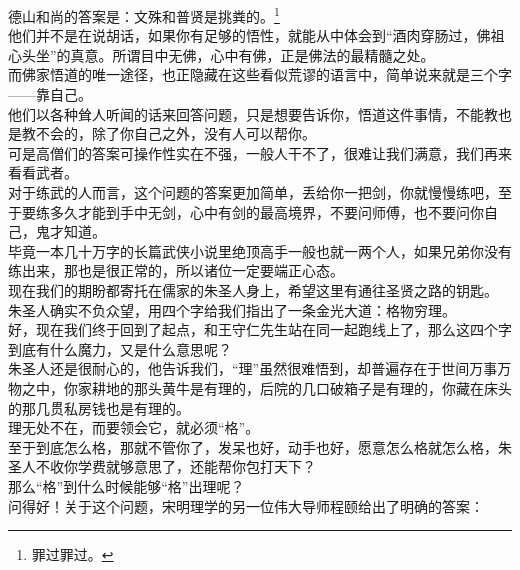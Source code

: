 \begin{multicols}{\theparacolNo}
德山和尚的答案是：文殊和普贤是挑粪的。\footnote{罪过罪过。}\\

他们并不是在说胡话，如果你有足够的悟性，就能从中体会到“酒肉穿肠过，佛祖心头坐”的真意。所谓目中无佛，心中有佛，正是佛法的最精髓之处。\\

而佛家悟道的唯一途径，也正隐藏在这些看似荒谬的语言中，简单说来就是三个字——靠自己。\\

他们以各种耸人听闻的话来回答问题，只是想要告诉你，悟道这件事情，不能教也是教不会的，除了你自己之外，没有人可以帮你。\\

可是高僧们的答案可操作性实在不强，一般人干不了，很难让我们满意，我们再来看看武者。\\

对于练武的人而言，这个问题的答案更加简单，丢给你一把剑，你就慢慢练吧，至于要练多久才能到手中无剑，心中有剑的最高境界，不要问师傅，也不要问你自己，鬼才知道。\\

毕竟一本几十万字的长篇武侠小说里绝顶高手一般也就一两个人，如果兄弟你没有练出来，那也是很正常的，所以诸位一定要端正心态。\\

现在我们的期盼都寄托在儒家的朱圣人身上，希望这里有通往圣贤之路的钥匙。\\

朱圣人确实不负众望，用四个字给我们指出了一条金光大道：格物穷理。\\

好，现在我们终于回到了起点，和王守仁先生站在同一起跑线上了，那么这四个字到底有什么魔力，又是什么意思呢？\\

朱圣人还是很耐心的，他告诉我们，“理”虽然很难悟到，却普遍存在于世间万事万物之中，你家耕地的那头黄牛是有理的，后院的几口破箱子是有理的，你藏在床头的那几贯私房钱也是有理的。\\

理无处不在，而要领会它，就必须“格”。\\

至于到底怎么格，那就不管你了，发呆也好，动手也好，愿意怎么格就怎么格，朱圣人不收你学费就够意思了，还能帮你包打天下？\\

那么“格”到什么时候能够“格”出理呢？\\

问得好！关于这个问题，宋明理学的另一位伟大导师程颐给出了明确的答案：\\


\end{multicols}
